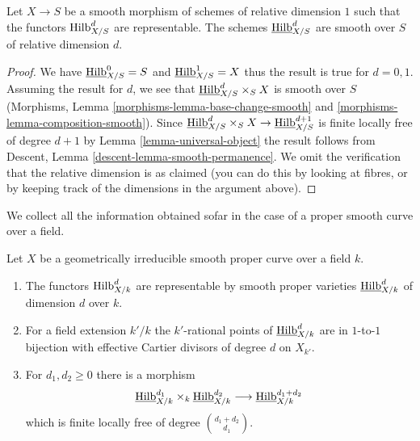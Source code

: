 \begin{lemma}
\label{lemma-hilb-d-smooth}
Let $X \to S$ be a smooth morphism of schemes of relative dimension $1$
such that the functors $\mathrm{Hilb}^d_{X/S}$ are representable. The
schemes $\underline{\mathrm{Hilb}}^d_{X/S}$ are smooth over $S$ of
relative dimension $d$.
\end{lemma}

\begin{proof}
We have $\underline{\mathrm{Hilb}}^0_{X/S} = S$ and
$\underline{\mathrm{Hilb}}^1_{X/S} = X$ thus the result is true for $d = 0, 1$.
Assuming the result for $d$, we see that
$\underline{\mathrm{Hilb}}^d_{X/S} \times_S X$ is smooth over $S$
(Morphisms, Lemma \ref{morphisms-lemma-base-change-smooth} and
\ref{morphisms-lemma-composition-smooth}). Since
$\underline{\mathrm{Hilb}}^d_{X/S} \times_S X \to
\underline{\mathrm{Hilb}}^{d + 1}_{X/S}$
is finite locally free of degree $d + 1$ by
Lemma \ref{lemma-universal-object}
the result follows from
Descent, Lemma \ref{descent-lemma-smooth-permanence}.
We omit the verification that the relative dimension is
as claimed (you can do this by looking at fibres, or by
keeping track of the dimensions in the argument above).
\end{proof}

\noindent
We collect all the information obtained sofar in the case of
a proper smooth curve over a field.

\begin{proposition}
\label{proposition-hilb-d}
Let $X$ be a geometrically irreducible smooth proper curve over a field $k$.
\begin{enumerate}
\item The functors $\mathrm{Hilb}^d_{X/k}$ are representable by smooth
proper varieties $\underline{\mathrm{Hilb}}^d_{X/k}$ of dimension
$d$ over $k$.
\item For a field extension $k'/k$ the $k'$-rational points
of $\underline{\mathrm{Hilb}}^d_{X/k}$ are in $1$-to-$1$ bijection
with effective Cartier divisors of degree $d$ on $X_{k'}$.
\item For $d_1, d_2 \geq 0$ there is a morphism
$$
\underline{\mathrm{Hilb}}^{d_1}_{X/k}
\times_k
\underline{\mathrm{Hilb}}^{d_2}_{X/k}
\longrightarrow
\underline{\mathrm{Hilb}}^{d_1 + d_2}_{X/k}
$$
which is finite locally free of degree ${d_1 + d_2 \choose d_1}$.
\end{enumerate}
\end{proposition}

